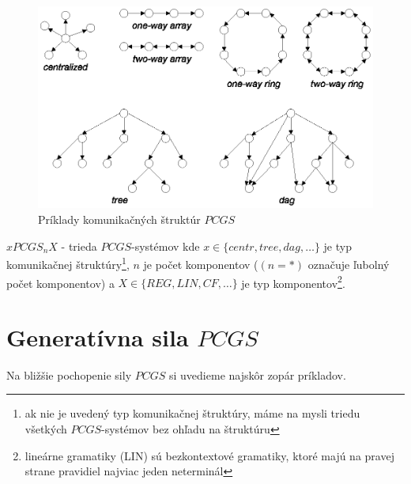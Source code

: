 \begin{figure}[t]
  \centering
  \includegraphics{img/pcgs/structur}
  \caption{Príklady komunikačných štruktúr $PCGS$} \label{pcgs_obr_structures}
\end{figure}

\begin{oznacenie}
  $xPCGS_nX$ - trieda $PCGS$-systémov kde
  $x\in\{centr,tree,dag,\dots\}$ je typ komunikačnej
  štruktúry\footnote{ak nie je uvedený typ komunikačnej štruktúry,
  máme na mysli triedu všetkých $PCGS$-systémov bez ohľadu na
  štruktúru}, $n$ je počet komponentov ($(n=*)$ označuje ľubolný
  počet komponentov) a $X\in\{REG,LIN,CF,\dots\}$ je typ
  komponentov\footnote{lineárne gramatiky (LIN) sú bezkontextové
  gramatiky, ktoré majú na pravej strane pravidiel najviac jeden
  neterminál}.
\end{oznacenie}

\section{Generatívna sila $PCGS$}

Na bližšie pochopenie sily $PCGS$ si uvedieme najskôr zopár
príkladov.

